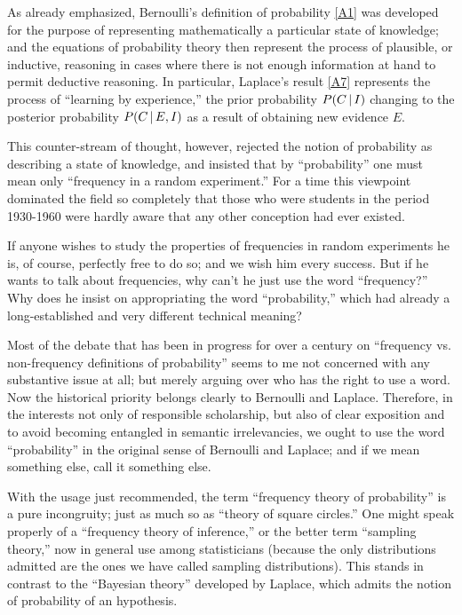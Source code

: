 As already emphasized, Bernoulli's definition of probability \eqref{A1} was developed for the purpose of representing mathematically a particular state of knowledge; and the equations of probability theory then represent the process of plausible, or inductive, reasoning in cases where there is not enough information at hand to permit deductive reasoning.
In particular, Laplace's result \eqref{A7} represents the process of ``learning by experience,'' the prior probability $P(C\,\vert\, I)$ changing to the posterior probability $P(C\,\vert\, E,I)$ as a result of obtaining new evidence $E$.

This counter-stream of thought, however, rejected the notion of probability as describing a state of knowledge, and insisted that by ``probability'' one must mean only ``frequency in a random experiment.'' For a time this viewpoint dominated the field so completely that those who were students in the period 1930-1960 were hardly aware that any other conception had ever existed.

If anyone wishes to study the properties of frequencies in random experiments he is, of course, perfectly free to do so; and we wish him every success.
But if he wants to talk about frequencies, why can't he just use the word ``frequency?''
Why does he insist on appropriating the word ``probability,'' which had already a long-established and very different technical meaning?

Most of the debate that has been in progress for over a century on ``frequency vs. non-frequency definitions of probability'' seems to me not concerned with any substantive issue at all; but merely arguing over who has the right to use a word.
Now the historical priority belongs clearly to Bernoulli and Laplace.
Therefore, in the interests not only of responsible scholarship, but also of clear exposition and to avoid becoming entangled in semantic irrelevancies, we ought to use the word ``probability'' in the original sense of Bernoulli and Laplace; and if we mean something else, call it something else.

With the usage just recommended, the term ``frequency theory of probability'' is a pure incongruity; just as much so as ``theory of square circles.''
One might speak properly of a ``frequency theory of inference,'' or the better term ``sampling theory,'' now in general use among statisticians (because the only distributions admitted are the ones we have called sampling distributions).
This stands in contrast to the ``Bayesian theory'' developed by Laplace, which admits the notion of probability of an hypothesis.

